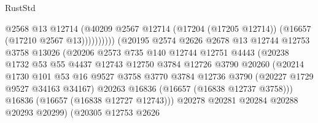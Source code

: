 \begin{lexlean}{RustStd}
\begin{coremodule}
                                          @2568
                                          @13
                                          @12714
                                          (@40209
                                            @2567
                                            @12714
                                            (@17204 (@17205 @12714))
                                            (@16657 (@17210 @2567 @13))))))))))
                            (@20195
                              @2574
                              @2626
                              @2678
                              @13
                              @12744
                              @12753
                              @3758
                              @13026
                              (@20206
                                @2573
                                @735
                                @140
                                @12744
                                @12751
                                @4443
                                (@20238
                                  @1732
                                  @53
                                  @55
                                  @4437
                                  @12743
                                  @12750
                                  @3784
                                  @12726
                                  @3790
                                  @20260
                                  (@20214
                                    @1730
                                    @101
                                    @53
                                    @16
                                    @9527
                                    @3758
                                    @3770
                                    @3784
                                    @12736
                                    @3790
                                    (@20227 @1729 @9527 @34163 @34167)
                                    @20263
                                    @16836
                                    (@16657 (@16838 @12737 @3758)))
                                  @16836
                                  (@16657 (@16838 @12727 @12743)))
                                @20278
                                @20281
                                @20284
                                @20288
                                @20293
                                @20299)
                              (@20305
                                @12753
                                @2626

\end{coremodule}
\end{lexlean}
